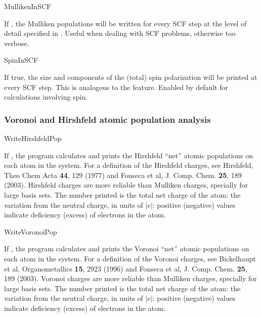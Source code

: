 \begin{fdflogicalF}{MullikenInSCF}

  If \fdftrue, the Mulliken populations will be written for every SCF
  step at the level of detail specified in
  . Useful when dealing with SCF problems,
  otherwise too verbose.
  
\end{fdflogicalF}


\begin{fdflogicalT}{SpinInSCF}

If true, the size and components of the (total) spin polarization will
be printed at every SCF step.  This is analogous to the
 feature.  Enabled by default for calculations
involving spin.

\end{fdflogicalT}

\subsubsection{Voronoi and Hirshfeld atomic population analysis}


\begin{fdflogicalF}{WriteHirshfeldPop}

  If \fdftrue, the program calculates and prints the Hirshfeld ``net''
  atomic populations on each atom in the system. For a definition of
  the Hirshfeld charges, see Hirshfeld, Theo Chem Acta \textbf{44},
  129 (1977) and Fonseca et al, J. Comp. Chem. \textbf{25}, 189
  (2003).  Hirshfeld charges are more reliable than Mulliken charges,
  specially for large basis sets.  The number printed is the total net
  charge of the atom: the variation from the neutral charge, in units
  of $|e|$: positive (negative) values indicate deficiency (excess) of
  electrons in the atom.

\end{fdflogicalF}

\begin{fdflogicalF}{WriteVoronoiPop}

  If \fdftrue, the program calculates and prints the Voronoi ``net''
  atomic populations on each atom in the system. For a definition of
  the Voronoi charges, see Bickelhaupt et al, Organometallics
  \textbf{15}, 2923 (1996) and Fonseca et al,
  J. Comp. Chem. \textbf{25}, 189 (2003).  Voronoi charges are more
  reliable than Mulliken charges, specially for large basis sets.  The
  number printed is the total net charge of the atom: the variation
  from the neutral charge, in units of $|e|$: positive (negative)
  values indicate deficiency (excess) of electrons in the atom.

\end{fdflogicalF}

